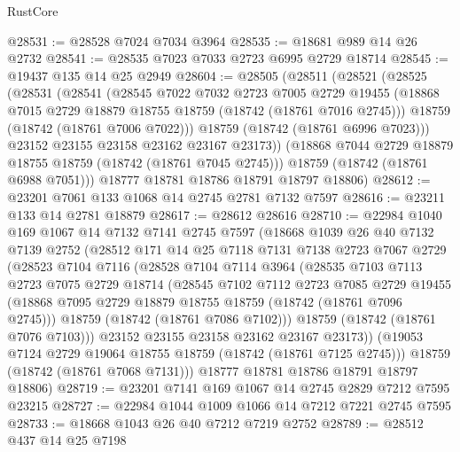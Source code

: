 \begin{lexlean}{RustCore}
\begin{coremodule}
@28531 := @28528 @7024 @7034 @3964
@28535 := @18681 @989 @14 @26 @2732
@28541 := @28535 @7023 @7033 @2723 @6995 @2729 @18714
@28545 := @19437 @135 @14 @25 @2949
@28604 := @28505
    (@28511
      (@28521
        (@28525
          (@28531
            (@28541
              (@28545
                @7022
                @7032
                @2723
                @7005
                @2729
                @19455
                (@18868 @7015 @2729 @18879 @18755 @18759 (@18742 (@18761 @7016 @2745)))
                @18759
                (@18742 (@18761 @7006 @7022)))
              @18759
              (@18742 (@18761 @6996 @7023)))
            @23152
            @23155
            @23158
            @23162
            @23167
            @23173))
        (@18868 @7044 @2729 @18879 @18755 @18759 (@18742 (@18761 @7045 @2745)))
        @18759
        (@18742 (@18761 @6988 @7051)))
      @18777
      @18781
      @18786
      @18791
      @18797
      @18806)
@28612 := @23201 @7061 @133 @1068 @14 @2745 @2781 @7132 @7597
@28616 := @23211 @133 @14 @2781 @18879
@28617 := @28612 @28616
@28710 := @22984
    @1040
    @169
    @1067
    @14
    @7132
    @7141
    @2745
    @7597
    (@18668
      @1039
      @26
      @40
      @7132
      @7139
      @2752
      (@28512
        @171
        @14
        @25
        @7118
        @7131
        @7138
        @2723
        @7067
        @2729
        (@28523
          @7104
          @7116
          (@28528
            @7104
            @7114
            @3964
            (@28535
              @7103
              @7113
              @2723
              @7075
              @2729
              @18714
              (@28545
                @7102
                @7112
                @2723
                @7085
                @2729
                @19455
                (@18868 @7095 @2729 @18879 @18755 @18759 (@18742 (@18761 @7096 @2745)))
                @18759
                (@18742 (@18761 @7086 @7102)))
              @18759
              (@18742 (@18761 @7076 @7103)))
            @23152
            @23155
            @23158
            @23162
            @23167
            @23173))
        (@19053 @7124 @2729 @19064 @18755 @18759 (@18742 (@18761 @7125 @2745)))
        @18759
        (@18742 (@18761 @7068 @7131)))
      @18777
      @18781
      @18786
      @18791
      @18797
      @18806)
@28719 := @23201 @7141 @169 @1067 @14 @2745 @2829 @7212 @7595 @23215
@28727 := @22984 @1044 @1009 @1066 @14 @7212 @7221 @2745 @7595
@28733 := @18668 @1043 @26 @40 @7212 @7219 @2752
@28789 := @28512
    @437
    @14
    @25
    @7198

\end{coremodule}
\end{lexlean}
